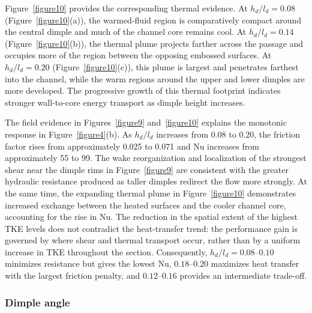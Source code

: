 \documentclass[energies,article,submit,moreauthors,noheaderline]{Definitions/mdpi}
\begin{document}


Figure~\ref{figure10} provides the corresponding thermal evidence. At $h_d/l_d=0.08$ (Figure~\ref{figure10}(a)), the warmed-fluid region is comparatively compact around the central dimple and much of the channel core remains cool. At $h_d/l_d=0.14$ (Figure~\ref{figure10}(b)), the thermal plume projects farther across the passage and occupies more of the region between the opposing embossed surfaces. At $h_d/l_d=0.20$ (Figure~\ref{figure10}(c)), this plume is largest and penetrates farthest into the channel, while the warm regions around the upper and lower dimples are more developed. The progressive growth of this thermal footprint indicates stronger wall-to-core energy transport as dimple height increases.

The field evidence in Figures~\ref{figure9} and~\ref{figure10} explains the monotonic response in Figure~\ref{figure4}(b). As $h_d/l_d$ increases from 0.08 to 0.20, the friction factor rises from approximately 0.025 to 0.071 and Nu increases from approximately 55 to 99. The wake reorganization and localization of the strongest shear near the dimple rims in Figure~\ref{figure9} are consistent with the greater hydraulic resistance produced as taller dimples redirect the flow more strongly. At the same time, the expanding thermal plume in Figure~\ref{figure10} demonstrates increased exchange between the heated surfaces and the cooler channel core, accounting for the rise in Nu. The reduction in the spatial extent of the highest TKE levels does not contradict the heat-transfer trend: the performance gain is governed by where shear and thermal transport occur, rather than by a uniform increase in TKE throughout the section. Consequently, $h_d/l_d=0.08$--$0.10$ minimizes resistance but gives the lowest Nu, $0.18$--$0.20$ maximizes heat transfer with the largest friction penalty, and $0.12$--$0.16$ provides an intermediate trade-off.

\subsubsection{Dimple angle}
\label{sec:disc_dimple_angle}
\end{document}
